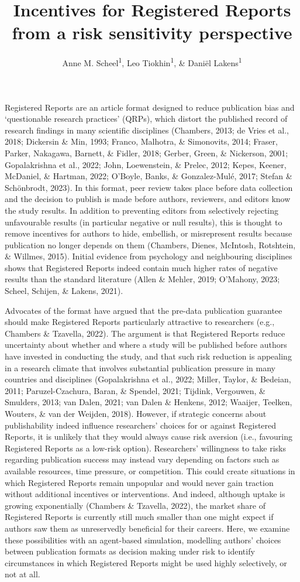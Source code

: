 \documentclass[
  ,man,mask,floatsintext]{apa6}
\title{Incentives for Registered Reports from a risk sensitivity perspective}
\author{Anne M. Scheel\textsuperscript{1}, Leo Tiokhin\textsuperscript{1}, \& Daniël Lakens\textsuperscript{1}}
\date{}
\affiliation{\vspace{0.5cm}\textsuperscript{1} Eindhoven University of Technology}
\begin{document}
\maketitle

Registered Reports are an article format designed to reduce publication bias and `questionable research practices' (QRPs), which distort the published record of research findings in many scientific disciplines (Chambers, 2013; de Vries et al., 2018; Dickersin \& Min, 1993; Franco, Malhotra, \& Simonovits, 2014; Fraser, Parker, Nakagawa, Barnett, \& Fidler, 2018; Gerber, Green, \& Nickerson, 2001; Gopalakrishna et al., 2022; John, Loewenstein, \& Prelec, 2012; Kepes, Keener, McDaniel, \& Hartman, 2022; O'Boyle, Banks, \& Gonzalez-Mulé, 2017; Stefan \& Schönbrodt, 2023).
In this format, peer review takes place before data collection and the decision to publish is made before authors, reviewers, and editors know the study results.
In addition to preventing editors from selectively rejecting unfavourable results (in particular negative or null results), this is thought to remove incentives for authors to hide, embellish, or misrepresent results because publication no longer depends on them
(Chambers, Dienes, McIntosh, Rotshtein, \& Willmes, 2015).
Initial evidence from psychology and neighbouring disciplines shows that Registered Reports indeed contain much higher rates of negative results than the standard literature (Allen \& Mehler, 2019; O'Mahony, 2023; Scheel, Schijen, \& Lakens, 2021).

Advocates of the format have argued that the pre-data publication guarantee should make Registered Reports particularly attractive to researchers (e.g., Chambers \& Tzavella, 2022).
The argument is that Registered Reports reduce uncertainty about whether and where a study will be published before authors have invested in conducting the study, and that such risk reduction is appealing
in a research climate that involves substantial publication pressure in many countries and disciplines (Gopalakrishna et al., 2022; Miller, Taylor, \& Bedeian, 2011; Paruzel-Czachura, Baran, \& Spendel, 2021; Tijdink, Vergouwen, \& Smulders, 2013; van Dalen, 2021; van Dalen \& Henkens, 2012; Waaijer, Teelken, Wouters, \& van der Weijden, 2018).
However, if strategic concerns about publishability indeed influence researchers' choices for or against Registered Reports, it is unlikely that they would always cause risk aversion (i.e., favouring Registered Reports as a low-risk option).
Researchers' willingness to take risks regarding publication success may instead vary depending on factors such as available resources, time pressure, or competition.
This could create situations in which Registered Reports remain unpopular and would never gain traction without additional incentives or interventions.
And indeed, although uptake is growing exponentially (Chambers \& Tzavella, 2022), the market share of Registered Reports is currently still much smaller than one might expect if authors saw them as unreservedly beneficial for their careers.
Here, we examine these possibilities with an agent-based simulation, modelling authors' choices between publication formats as decision making under risk to identify circumstances in which Registered Reports might be used highly selectively, or not at all.
\end{document}
